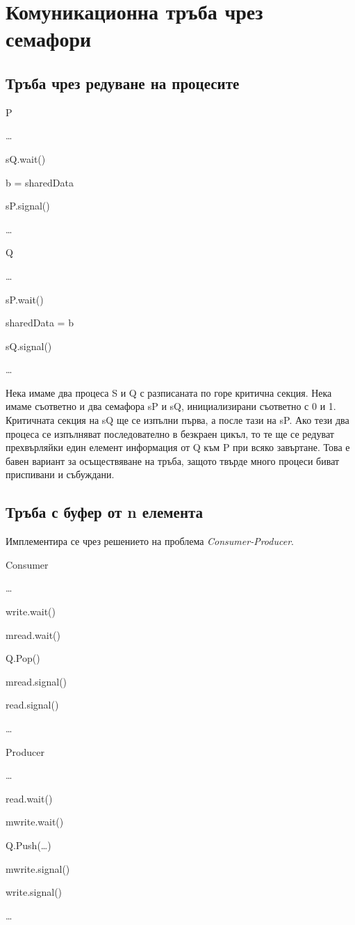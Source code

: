 \documentclass[fleqn,12pt]{article}
\begin{document}
\section{Комуникационна тръба чрез семафори}

\subsection{Тръба чрез редуване на процесите}
\begin{multicols}{2}
    P

    \dots

    sQ.wait()
    
    b = sharedData
    
    sP.signal()
    
    \dots

\columnbreak
    Q
    
    \dots
    
    sP.wait()
    
    sharedData = b
    
    sQ.signal()
    
    \dots

\end{multicols}

Нека имаме два процеса S и Q с разписаната по горе критична секция.
Нека имаме съответно и два семафора sP и sQ, инициализирани съответно с 0 и 1.
Критичната секция на sQ ще се изпълни първа, а после тази на sP.
Ако тези два процеса се изпълняват последователно в безкраен цикъл, то те ще се редуват прехвърляйки един елемент информация от Q към P при всяко завъртане.
Това е бавен вариант за осъществяване на тръба, защото твърде много процеси биват приспивани и събуждани.

\subsection{Тръба с буфер от n елемента}
    Имплементира се чрез решението на проблема \textit{Consumer-Producer}.

    \begin{multicols}{2}
        Consumer
    
        \dots
    
        write.wait()

        mread.wait()
        
        Q.Pop()

        mread.signal()
        
        read.signal()

        \dots
    
    \columnbreak
        Producer
        
        \dots
        
        read.wait()

        mwrite.wait()
        
        Q.Push(\dots)

        mwrite.signal()
        
        write.signal()

        \dots
    
    \end{multicols}
\end{document}
